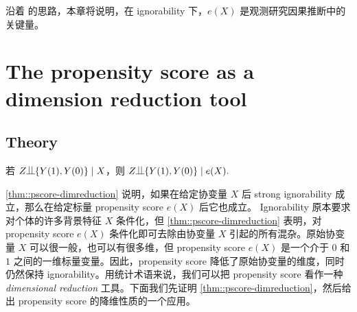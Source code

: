 沿着 \citet{rosenbaum1983central} 的思路，本章将说明，在 ignorability 下，$e(X)$ 是观测研究因果推断中的关键量。

 


\section{The propensity score as a dimension reduction tool}

\subsection{Theory}

\begin{theorem}
\label{thm::pscore-dimreduction}
若 $Z\ind \{ Y(1), Y(0)  \} \mid X$，则
$
Z\ind \{ Y(1), Y(0)  \} \mid e(X).
$
\end{theorem}

\cref{thm::pscore-dimreduction} 说明，如果在给定协变量 $X$ 后 strong ignorability 成立，那么在给定标量 propensity score $e(X)$ 后它也成立。
Ignorability 原本要求对个体的许多背景特征 $X$ 条件化，但 \cref{thm::pscore-dimreduction} 表明，对 propensity score $e(X)$ 条件化即可去除由协变量 $X$ 引起的所有混杂。原始协变量 $X$ 可以很一般，也可以有很多维，但 propensity score $e(X)$ 是一个介于 $0$ 和 $1$ 之间的一维标量变量。因此，propensity score 降低了原始协变量的维度，同时仍然保持 ignorability。用统计术语来说，我们可以把 propensity score 看作一种{\it dimensional reduction} 工具。下面我们先证明 \cref{thm::pscore-dimreduction}，然后给出 propensity score 的降维性质的一个应用。





